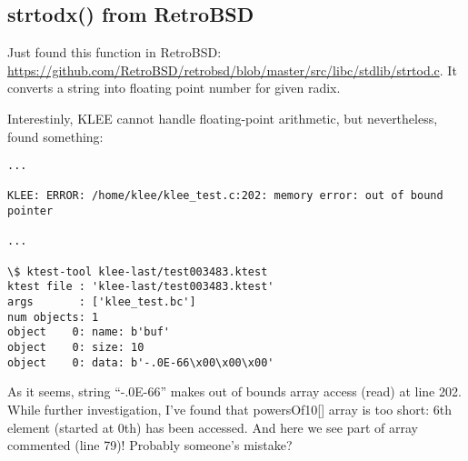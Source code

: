 \subsection{strtodx() from RetroBSD}

Just found this function in RetroBSD:
\url{https://github.com/RetroBSD/retrobsd/blob/master/src/libc/stdlib/strtod.c}.
It converts a string into floating point number for given radix.



Interestinly, KLEE cannot handle floating-point arithmetic, but nevertheless, found something:

\begin{lstlisting}
...

KLEE: ERROR: /home/klee/klee_test.c:202: memory error: out of bound pointer

...

\$ ktest-tool klee-last/test003483.ktest
ktest file : 'klee-last/test003483.ktest'
args       : ['klee_test.bc']
num objects: 1
object    0: name: b'buf'
object    0: size: 10
object    0: data: b'-.0E-66\x00\x00\x00'
\end{lstlisting}

As it seems, string ``-.0E-66'' makes out of bounds array access (read) at line 202.
While further investigation, I've found that powersOf10[] array is too short: 6th element (started at 0th) has been accessed.
And here we see part of array commented (line 79)!
Probably someone's mistake?


